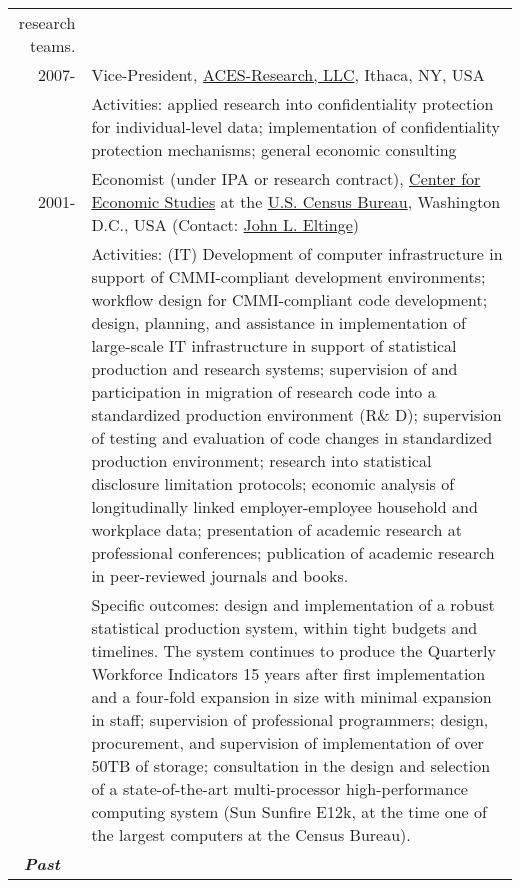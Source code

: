 \documentclass[10pt,letterpaper]{report}
\begin{document}
\begin{longtable}{rp{5in}}
         research teams.\\
2007-    & Vice-President,
\href{http://www.aces-research.com}{ACES-Research, LLC}, Ithaca,
NY, USA\\%
         &Activities: applied research into confidentiality protection for
         individual-level data;  implementation of confidentiality
         protection mechanisms; general economic consulting\\
2001-    &Economist (under IPA or research contract), \href{https://www.census.gov/ces}{Center for Economic Studies} at the
\href{http://www.census.gov}{U.S. Census Bureau}, Washington D.C., USA (Contact:
\href{mailto:john.l.eltinge@census.gov}{John L. Eltinge})\\
         &Activities: (IT) Development of computer infrastructure in support of
         CMMI-compliant development environments; workflow design for
         CMMI-compliant code development; design, planning, and
         assistance in implementation of large-scale IT infrastructure in
         support of statistical production and research systems; 
         supervision of and participation in migration of
         research code into a standardized production environment (R\& D);
         supervision of testing and evaluation of code changes in
         standardized production environment; research into statistical
         disclosure limitation protocols; economic analysis of
         longitudinally linked employer-employee household and workplace
         data; presentation of academic research at professional
         conferences; publication of academic research in peer-reviewed
         journals and books.\\[.3cm]
              &Specific outcomes: design and implementation of a robust statistical
              production system, within tight budgets and timelines. The
              system continues to produce the Quarterly Workforce Indicators
              15 years after first implementation and a four-fold expansion in size with minimal expansion in
              staff; supervision of professional programmers; design,
              procurement, and supervision of implementation of over 50TB
              of storage; consultation in the design and selection of a
              state-of-the-art multi-processor high-performance computing
              system (Sun Sunfire E12k, at the time one of the largest
              computers at the Census Bureau).\\
              
\multicolumn{2}{l}{\ \it \bf Past}\\


\end{longtable}
\end{document}

